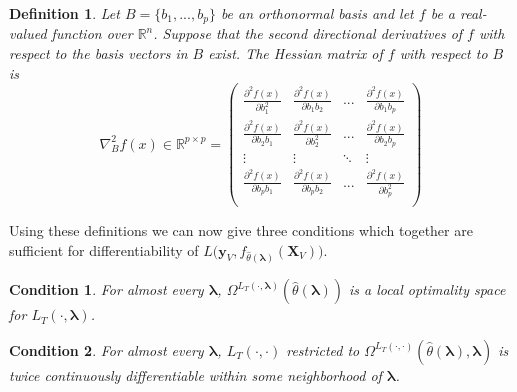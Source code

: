 \documentclass[10pt,letterpaper]{article}
\newtheorem{definition}{Definition}
\newtheorem{condition}{Condition}
\begin{document}
\begin{definition}
Let $B = \{ b_1, ..., b_p \}$ be an orthonormal basis and let $f$ be a real-valued function over $\mathbb{R}^n$. Suppose that the second directional derivatives of $f$ with respect to the basis vectors in $B$ exist. The Hessian matrix of $f$ with respect to $B$ is
\begin{equation}
\nabla^2_B f(x) \in \mathbb{R}^{p\times p} =
\left (
\begin{array}{cccc}
\frac{\partial^2 f(x)}{\partial b_1^2} & \frac{\partial^2 f(x)}{\partial b_1 b_2} & ...  & \frac{\partial^2 f(x)}{\partial b_1 b_p} \\
\frac{\partial^2 f(x)}{\partial b_2 b_1} & \frac{\partial^2 f(x)}{\partial b_2^2} & ...  & \frac{\partial^2 f(x)}{\partial b_2 b_p} \\
\vdots & \vdots &  \ddots & \vdots \\
\frac{\partial^2 f(x)}{\partial b_p b_1} & \frac{\partial^2 f(x)}{\partial b_p b_2} & ...  & \frac{\partial^2 f(x)}{\partial b_p^2} \\
\end{array}
\right )
\end{equation}
\end{definition}

Using these definitions we can now give three conditions which together are sufficient for differentiability of $L \Big( \boldsymbol{y}_V, f_{\hat{\theta}(\boldsymbol{\lambda})}(\boldsymbol{X}_V) \Big )$.

\begin{condition}
For almost every $\boldsymbol{\lambda}$, $\Omega^{L_T(\cdot, \boldsymbol{\lambda})}(\hat{\theta}\left(\boldsymbol{\lambda}\right))$ is a local optimality space for $L_T\left(\cdot,\boldsymbol{\lambda}\right)$.
\end{condition}

\begin{condition}
For almost every $\boldsymbol{\lambda}$, $L_T\left(\cdot, \cdot\right)$ restricted to $\Omega^{L_T(\cdot, \cdot)}(\hat{\theta}\left(\boldsymbol{\lambda}\right), \boldsymbol{\lambda})$ is twice continuously differentiable within some neighborhood of $\boldsymbol{\lambda}$.
\end{condition}
\end{document}
